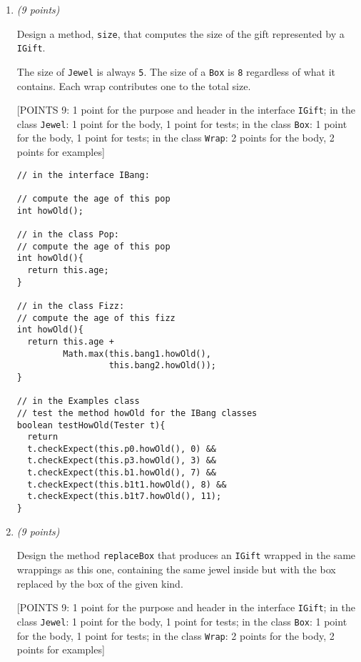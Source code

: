 \documentclass[11pt]{article}
\newcommand\code[1]{\texttt{#1}}
\newcounter{Pctr}
\newenvironment{problem}{\stepcounter{Pctr}%
\begin{description}
\item[\noindent{\bf Problem} \arabic{Pctr}] 
\end{description}}{\relax}
\begin{document}
\begin{problem}
\begin{enumerate}
\newpage
\item {\em{(9 points)}}

Design a method, \code{size}, that computes the size of the gift
represented by a \code{IGift}.

      The size of \code{Jewel} is always \code{5}.  The size
      of a \code{Box} is \code{8} regardless of what it contains. Each
      wrap contributes one to the total size.


\begsol{\vspace{0.5in}}
[POINTS 9: 1 point for the purpose and header in the interface
\texttt{IGift}; in the class \texttt{Jewel}: 1 point for the body, 1
point for tests; in the class \texttt{Box}: 1 point for the body, 1
point for tests; in the class \texttt{Wrap}: 2 
points for the body, 2 points for examples]

\begin{verbatim}
// in the interface IBang:

// compute the age of this pop
int howOld();

// in the class Pop:
// compute the age of this pop
int howOld(){
  return this.age;
}

// in the class Fizz:
// compute the age of this fizz
int howOld(){
  return this.age + 
         Math.max(this.bang1.howOld(), 
                  this.bang2.howOld());
}

// in the Examples class
// test the method howOld for the IBang classes
boolean testHowOld(Tester t){
  return
  t.checkExpect(this.p0.howOld(), 0) &&
  t.checkExpect(this.p3.howOld(), 3) &&
  t.checkExpect(this.b1.howOld(), 7) &&
  t.checkExpect(this.b1t1.howOld(), 8) &&
  t.checkExpect(this.b1t7.howOld(), 11);
}	
\end{verbatim}
\endsol

\newpage
\item {\em{(9 points)}}

Design the method \code{replaceBox} that produces an
    \code{IGift} wrapped in the same wrappings as this one,
    containing the same jewel  inside but with the box replaced by the
    box of the given kind.


\begsol{\vspace{0.5in}}
[POINTS 9: 1 point for the purpose and header in the interface
\texttt{IGift}; in the class \texttt{Jewel}: 1 point for the body, 1
point for tests; in the class \texttt{Box}: 1 point for the body, 1
point for tests; in the class \texttt{Wrap}: 2 
points for the body, 2 points for examples]


\end{enumerate}
\end{problem}
\end{document}
